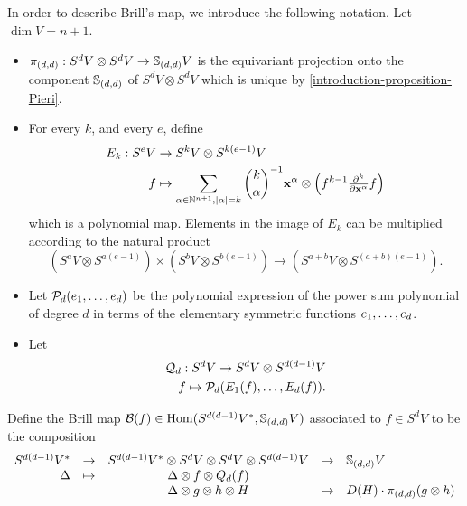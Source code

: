 In order to describe Brill's map, we introduce the following notation. Let $\dim V = n+1$.
\begin{itemize}
 \item $\pi_{(d,d)}: S^d V \otimes S^d V \to \mathbb{S}_{(d,d)} V$ is the equivariant projection onto the component $ \mathbb{S}_{(d,d)}$ of $S^d V \otimes S^d V$ which is unique by \ref{introduction-proposition-Pieri}.
 \item For every $k$, and every $e$, define
 \[
 \begin{aligned}
 E_k : S^e V &\to S^{k} V \otimes S^{k(e-1)}V  \\
 f &\mapsto \sum_{\alpha \in \mathbb{N}^{n+1}, |\alpha| = k} \binom{k}{\alpha}^{-1} \mathbf{x}^\alpha \otimes \left( f^{k-1}\textstyle \frac{\partial^k}{\partial \mathbf{x}^\alpha} f \right)
\end{aligned}
 \]
 which is a polynomial map. Elements in the image of $E_k$ can be multiplied according to the natural product 
 \[
( S^a V \otimes S^{a(e-1)} ) \times ( S^b V \otimes S^{b(e-1)} )  \to ( S^{a+b} V \otimes S^{(a+b)(e-1)} ).
\]
 \item Let $\mathcal{P}_d ( e_1 , \ldots , e_d)$ be the polynomial expression of the power sum polynomial of degree $d$ in terms of the elementary symmetric functions $e_1 , \ldots , e_d$. 
 \item Let 
 \[
 \begin{aligned}
 \mathcal{Q}_{d} : S^d V \to S^d V \otimes S^{d(d-1)}V \\
 f \mapsto \mathcal{P}_d ( E_1(f) , \ldots , E_d(f)).
 \end{aligned}
 \]
\end{itemize}
Define the Brill map $\mathcal{B}(f) \in \operatorname{Hom} ( S^{d(d-1)}V^* , \mathbb{S}_{(d,d)} V)$ associated to $f \in S^d V$ to be the composition
\[
\begin{array}{rcccl}
S^{d(d-1)}V^* &\to & S^{d(d-1)}V^* \otimes S^d V \otimes S^d V \otimes S^{d(d-1)} V & \to & \mathbb{S}_{(d,d)} V \\
\Delta &\mapsto &\Delta \otimes f \otimes Q_d(f)  & &\\
& & \Delta \otimes g \otimes h \otimes H &\mapsto & D(H) \cdot \pi_{(d,d)} (g \otimes h)
\end{array}
 \]




